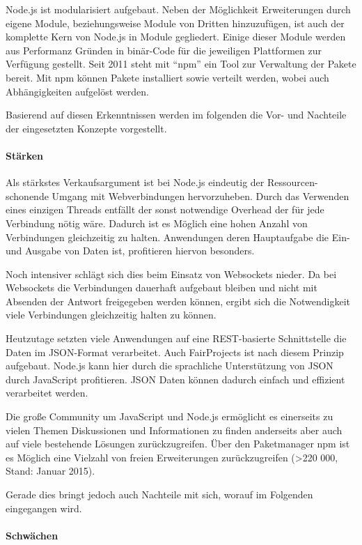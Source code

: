Node.js ist modularisiert aufgebaut. Neben der Möglichkeit Erweiterungen
durch eigene Module, beziehungsweise Module von Dritten hinzuzufügen,
ist auch der komplette Kern von Node.js in Module gegliedert. Einige
dieser Module werden aus Performanz Gründen in binär-Code für die
jeweiligen Plattformen zur Verfügung gestellt. Seit 2011 steht mit
``npm'' ein Tool zur Verwaltung der Pakete bereit. Mit npm können Pakete
installiert sowie verteilt werden, wobei auch Abhängigkeiten aufgelöst
werden.

Basierend auf diesen Erkenntnissen werden im folgenden die Vor- und
Nachteile der eingesetzten Konzepte vorgestellt.

\paragraph{Stärken}\label{stuxe4rken}

Als stärkstes Verkaufsargument ist bei Node.js eindeutig der
Ressourcen-schonende Umgang mit Webverbindungen hervorzuheben. Durch das
Verwenden eines einzigen Threads entfällt der sonst notwendige Overhead
der für jede Verbindung nötig wäre. Dadurch ist es Möglich eine hohen
Anzahl von Verbindungen gleichzeitig zu halten. Anwendungen deren
Hauptaufgabe die Ein- und Ausgabe von Daten ist, profitieren hiervon
besonders.

Noch intensiver schlägt sich dies beim Einsatz von Websockets nieder. Da
bei Websockets die Verbindungen dauerhaft aufgebaut bleiben und nicht
mit Absenden der Antwort freigegeben werden können, ergibt sich die
Notwendigkeit viele Verbindungen gleichzeitig halten zu können.

Heutzutage setzten viele Anwendungen auf eine REST-basierte
Schnittstelle die Daten im JSON-Format verarbeitet. Auch FairProjects
ist nach diesem Prinzip aufgebaut. Node.js kann hier durch die
sprachliche Unterstützung von JSON durch JavaScript profitieren. JSON
Daten können dadurch einfach und effizient verarbeitet werden.

Die große Community um JavaScript und Node.js ermöglicht es einerseits
zu vielen Themen Diskussionen und Informationen zu finden anderseits
aber auch auf viele bestehende Lösungen zurückzugreifen. Über den
Paketmanager npm ist es Möglich eine Vielzahl von freien Erweiterungen
zurückzugreifen (\textgreater{}220 000, Stand: Januar 2015).

Gerade dies bringt jedoch auch Nachteile mit sich, worauf im Folgenden
eingegangen wird.

\paragraph{Schwächen}\label{schwuxe4chen}

